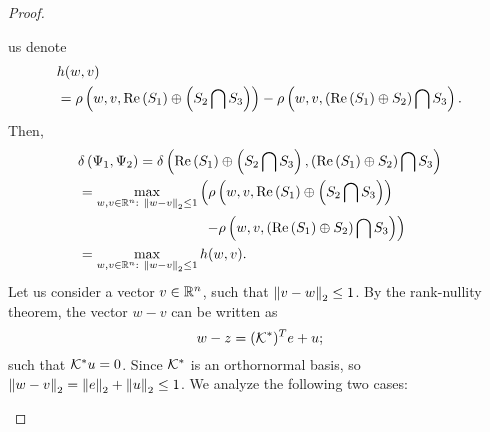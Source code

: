 \begin{proof}
\begin{enumerate}
  us denote
  \begin{align*}
    & h(w,v)\\ & =\rho\left(w,v,\operatorname{Re}\left(S_1\right)\oplus\left(S_2\bigcap
  S_3\right)\right)-\rho\left(w,v,\left(\operatorname{Re}\left(S_1\right)\oplus S_2\right)\bigcap
      S_3\right).
  \end{align*}
  Then,
  \begin{align*}
&
    \delta\left(\Psi_1,\Psi_2\right)=\delta\left(\operatorname{Re}\left(S_1\right)\oplus \left(S_2\bigcap S_3\right),\left(\operatorname{Re}\left(S_1\right)\oplus S_2\right)\bigcap S_3\right)\\
    & = \max_{w,v\in\mathbb{R}^n:~\left\|w-v\right\|_{2}\leq 1}\left(\rho\left(w,v,\operatorname{Re}\left(S_1\right)\oplus\left(S_2\bigcap
      S_3\right)\right)\right.\\
    & \left.\hspace{9em}-\rho\left(w,v,\left(\operatorname{Re}\left(S_1\right)\oplus S_2\right)\bigcap
      S_3\right)\right)\\
    & = \max_{w,v\in\mathbb{R}^n:~\left\|w-v\right\|_{2}\leq 1}h(w,v).
  \end{align*}
  Let us consider a vector 
  $v\in\mathbb{R}^n$, such that $\left\|v-w\right\|_{2}\leq 1$.  
  By the rank-nullity theorem,
  the vector $w-v$ can be written as
  \[
w-z=(\mathcal{K}^*)^Te+u;
  \]
  such that $\mathcal{K}^* u=0$.  Since $\mathcal{K}^*$ is an
  orthornormal basis, so $\left\|w-v\right\|_{2}=\left\|e\right\|_{2}+\left\|u\right\|_{2}\leq 1$.
  We analyze the following two cases:


\end{enumerate}
\end{proof}
